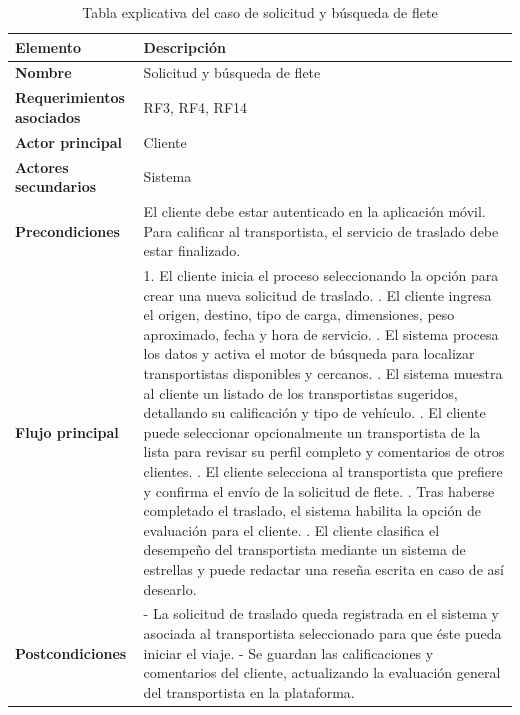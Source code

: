 \begin{table}
	\centering 
	\caption{Tabla explicativa del caso de solicitud y búsqueda de flete}
	\label{table: Tabla caso solicitud y búsqueda de flete}
	\renewcommand{\arraystretch}{1.4}
	\begin{tabular}{|p{4cm}|p{11cm}|}
		\hline
		\centering\textbf{Elemento} & \centering\textbf{Descripción}\tabularnewline
		\hline
		\textbf{Nombre} & Solicitud y búsqueda de flete \\
		\hline 
		\textbf{Requerimientos asociados} & RF3, RF4, RF14 \\
		\hline
		\textbf{Actor principal} & Cliente \\
		\hline
		\textbf{Actores secundarios} & Sistema \\
		\hline
		\textbf{Precondiciones} & El cliente debe estar autenticado en la aplicación móvil. Para calificar al transportista, el servicio de traslado debe estar finalizado. \\
		\hline
		\textbf{Flujo principal} & 
		1. El cliente inicia el proceso seleccionando la opción para crear una nueva solicitud de traslado. \newline 
		2. El cliente ingresa el origen, destino, tipo de carga, dimensiones, peso aproximado, fecha y hora de servicio. \newline 
		3. El sistema procesa los datos y activa el motor de búsqueda para localizar transportistas disponibles y cercanos. \newline 
		4. El sistema muestra al cliente un listado de los transportistas sugeridos, detallando su calificación y tipo de vehículo. \newline 
		5. El cliente puede seleccionar opcionalmente un transportista de la lista para revisar su perfil completo y comentarios de otros clientes. \newline 
		6. El cliente selecciona al transportista que prefiere y confirma el envío de la solicitud de flete. \newline 
		7. Tras haberse completado el traslado, el sistema habilita la opción de evaluación para el cliente. \newline 
		8. El cliente clasifica el desempeño del transportista mediante un sistema de estrellas y puede redactar una reseña escrita en caso de así desearlo. \\
		\hline
		\textbf{Postcondiciones} & 
		- La solicitud de traslado queda registrada en el sistema y asociada al transportista seleccionado para que éste pueda iniciar el viaje. \newline
		- Se guardan las calificaciones y comentarios del cliente, actualizando la evaluación general del transportista en la plataforma. \\
		\hline
	\end{tabular} 
\end{table}




